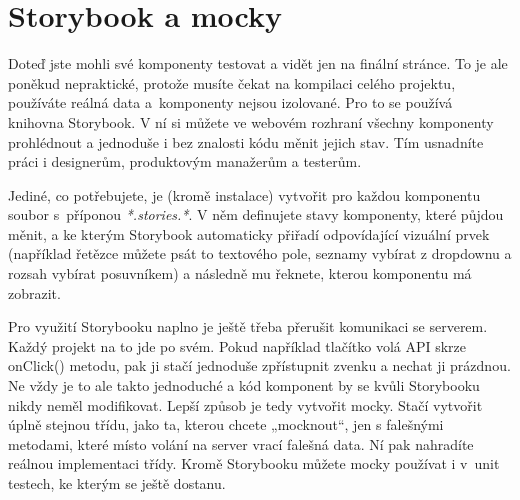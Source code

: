 \section{Storybook a mocky}

Doteď jste mohli své komponenty testovat a vidět jen na finální stránce. To je ale poněkud nepraktické, protože musíte čekat na kompilaci celého projektu, používáte reálná data a~komponenty nejsou izolované. Pro to se používá knihovna Storybook. V ní si můžete ve webovém rozhraní všechny komponenty prohlédnout a jednoduše i bez znalosti kódu měnit jejich stav. Tím usnadníte práci i designerům, produktovým manažerům a testerům.

Jediné, co potřebujete, je (kromě instalace) vytvořit pro každou komponentu soubor s~příponou \textit{*.stories.*}. V něm definujete stavy komponenty, které půjdou měnit, a ke kterým Storybook automaticky přiřadí odpovídající vizuální prvek (například řetězce můžete psát to textového pole, seznamy vybírat z dropdownu a rozsah vybírat posuvníkem) a následně mu řeknete, kterou komponentu má zobrazit.

Pro využití Storybooku naplno je ještě třeba přerušit komunikaci se serverem. Každý projekt na to jde po svém. Pokud například tlačítko volá API skrze onClick() metodu, pak ji stačí jednoduše zpřístupnit zvenku a nechat ji prázdnou. Ne vždy je to ale takto jednoduché a kód komponent by se kvůli Storybooku nikdy neměl modifikovat. Lepší způsob je tedy vytvořit mocky\cite{Mocks}. Stačí vytvořit úplně stejnou třídu, jako ta, kterou chcete „mocknout“, jen s falešnými metodami, které místo volání na server vrací falešná data. Ní pak nahradíte reálnou implementaci třídy. Kromě Storybooku můžete mocky používat i v~unit testech, ke kterým se ještě dostanu.